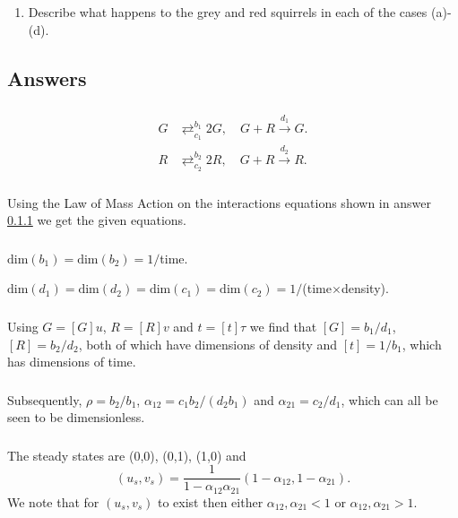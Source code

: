 \documentclass[]{article}
\newcommand{\bb}{\begin{equation}}
\newcommand{\ee}{\end{equation}}
\begin{document}
\begin{enumerate}
Use these sketches to determine the stability of $(u_s,v_s)$, when it exists.
\item Describe what happens to the grey and red squirrels in each of the cases (a)-(d).
\end{enumerate}
\begin{Answ}
\subsection{Answers}
\subsubsection{}\label{Interaction_equations}
\begin{align}
G&\mathrel{\mathop{\rightleftarrows}^{b_1}_{c_1}}2G,\quad G+R\stackrel{d_1}{\rightarrow}G.\\
R&\mathrel{\mathop{\rightleftarrows}^{b_2}_{c_2}}2R,\quad G+R\stackrel{d_2}{\rightarrow}R.
\end{align}
\subsubsection{}
Using the Law of Mass Action on the interactions equations shown in answer \ref{Interaction_equations} we get the given equations.
\subsubsection{}
$\textrm{dim}(b_1)=\textrm{dim}(b_2)=1/$time.

\noindent$\textrm{dim}(d_1)=\textrm{dim}(d_2)=\textrm{dim}(c_1)=\textrm{dim}(c_2)=1/$(time$\times$density).

\subsubsection{}
Using $G=[G]u$, $R=[R]v$ and $t= [t]\tau$ we find that $[G]=b_1/d_1$, $[R]=b_2/d_2$, both of which have dimensions of density and $[t]=1/b_1$, which has dimensions of time.
\subsubsection{}
Subsequently, $\rho=b_2/b_1$, $\alpha_{12}=c_1b_2/(d_2b_1)$ and $\alpha_{21}=c_2/d_1$, which can all be seen to be dimensionless.
\subsubsection{}
The steady states are (0,0), (0,1), (1,0) and
\bb
(u_s,v_s)=\frac{1}{1-\alpha_{12}\alpha_{21}}(1-\alpha_{12},1-\alpha_{21}).
\ee
We note that for $(u_s,v_s)$ to exist then either $\alpha_{12}, \alpha_{21}<1$ or $\alpha_{12}, \alpha_{21}>1$.

\end{Answ}
\end{document}
